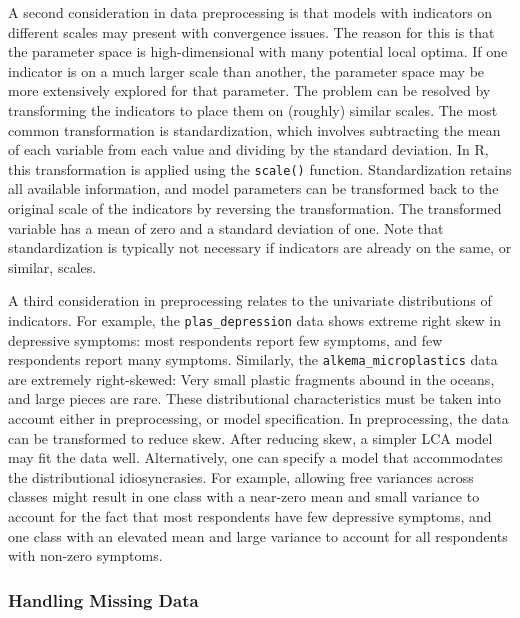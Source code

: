 \documentclass[
  ,man,floatsintext]{apa6}
\begin{document}
A second consideration in data preprocessing is that models with indicators on different scales may present with convergence issues.
The reason for this is that the parameter space is high-dimensional with many potential local optima.
If one indicator is on a much larger scale than another, the parameter space may be more extensively explored for that parameter.
The problem can be resolved by transforming the indicators to place them on (roughly) similar scales.
The most common transformation is standardization, which involves subtracting the mean of each variable from each value and dividing by the standard deviation.
In R, this transformation is applied using the \texttt{scale()} function.
Standardization retains all available information,
and model parameters can be transformed back to the original scale of the indicators by reversing the transformation.
The transformed variable has a mean of zero and a standard deviation of one.
Note that standardization is typically not necessary if indicators are already on the same, or similar, scales.

A third consideration in preprocessing relates to the univariate distributions of indicators.
For example, the \texttt{plas\_depression} data shows extreme right skew in depressive symptoms:
most respondents report few symptoms,
and few respondents report many symptoms.
Similarly, the \texttt{alkema\_microplastics} data are extremely right-skewed: Very small plastic fragments abound in the oceans, and large pieces are rare.
These distributional characteristics must be taken into account either in preprocessing, or model specification.
In preprocessing, the data can be transformed to reduce skew.
After reducing skew, a simpler LCA model may fit the data well.
Alternatively,
one can specify a model that accommodates the distributional idiosyncrasies.
For example, allowing free variances across classes might result in one class with a near-zero mean and small variance to account for the fact that most respondents have few depressive symptoms,
and one class with an elevated mean and large variance to account for all respondents with non-zero symptoms.

\hypertarget{handling-missing-data}{%
\subsubsection{Handling Missing Data}\label{handling-missing-data}}
\end{document}
